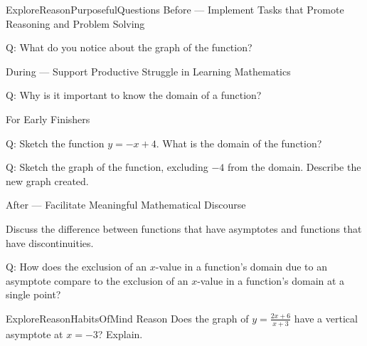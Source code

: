 \documentclass{article}
\newenvironment{te-addendum}[2]{}{}     %
\newcommand{\answer}[1]{}               %
\begin{document}
\begin{te-addendum}{ExploreReason}{PurposefulQuestions}
Before --- Implement Tasks that Promote Reasoning and Problem Solving

Q: What do you notice about the graph of the function?
\answer{Sample: $x$-intercept $=-2$; $y$-intercept $=2$; The function is linear.}

During --- Support Productive Struggle in Learning Mathematics

Q: Why is it important to know the domain of a function?
\answer{The domain needs to make sense for the scenario. For example, a real-world problem involving time should remain in Quadrant I on a graph because all numbers should be positive. Also, some values of $x$ cause the function to be undefined, so they cannot be included in the domain.}

For Early Finishers

Q: Sketch the function $y=-x+4$. What is the domain of the function?
\answer{all real numbers}

Q: Sketch the graph of the function, excluding $-4$ from the domain. Describe the new graph created.
\answer{The graph is a linear function with a negative slope and an opening at $x=-4$. The $x$-intercept is 4, and the $y$-intercept is 4.}

After --- Facilitate Meaningful Mathematical Discourse

Discuss the difference between functions that have asymptotes and functions that have discontinuities.

Q: How does the exclusion of an $x$-value in a function's domain due to an asymptote compare to the exclusion of an $x$-value in a function's domain at a single point?
\answer{An asymptote occurs when there is an expression in a fraction's denominator that equals zero and the numerator is not equal to zero for that value. The graph curves on either side of the asymptote and gets close to but never touches it. When the exclusion is at a single point, the graph appears to have a ``hole'' at the excluded value, with the function attaining values ``close'' to the hole.}
\end{te-addendum}

\begin{te-addendum}{ExploreReason}{HabitsOfMind}
Reason Does the graph of $y=\frac{2x+6}{x+3}$ have a vertical asymptote at $x=-3$? Explain.
\answer{No; because the function approaches the point $(-3,2)$ from both sides, there is a hole at $x=-3$ instead of an asymptote.}
\end{te-addendum}
\end{document}
